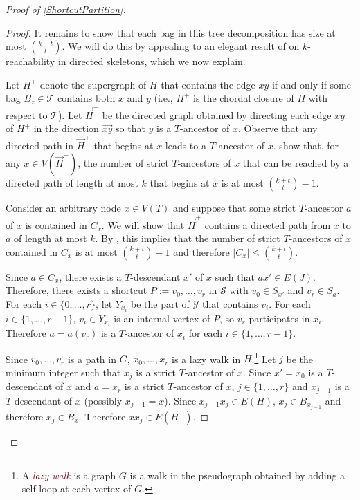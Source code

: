 \documentclass{patmorin}
\theoremstyle{plain}
\theoremstyle{definition}
\newcommand{\defin}[1]{\textcolor{Maroon}{\emph{#1}}}
\renewcommand{\SS}{\mathcal{S}}
\renewcommand{\le}{\leqslant}
\begin{document}
\begin{proof}[Proof of \cref{ShortcutPartition}]
\begin{proof}
  It remains to show that each bag in this tree decomposition has size at most $\binom{k+t}{t}$.  We will do this by appealing to an elegant result of \citet{PS21} on $k$-reachability in directed skeletons, which we now explain.

  Let $H^+$ denote the supergraph of $H$ that contains the edge $xy$ if and only if some bag $B_z\in\mathcal{T}$ contains both $x$ and $y$ (i.e., $H^+$ is the chordal closure of $H$ with respect to $\mathcal{T}$).  Let $\overrightarrow{H}^+$ be the directed graph obtained by directing each edge $xy$ of $H^+$ in the direction $\overrightarrow{xy}$ so that $y$ is a $T$-ancestor of $x$. Observe that any directed path in $\overrightarrow{H}^+$ that begins at $x$ leads to a $T$-ancestor of $x$.  \citet[Lemma~13]{PS21} show that, for any $x\in V(\overrightarrow{H}^+)$, the number of strict $T$-ancestors of $x$ that can be reached by a directed path of length at most $k$ that begins at $x$ is at most $\binom{k+t}{t}-1$.

  Consider an arbitrary node $x\in V(T)$ and suppose that some strict $T$-ancestor $a$ of $x$ is contained in $C_x$.  We will show that $\overrightarrow{H}^+$ contains a directed path from $x$ to $a$ of length at most $k$.  By \cite[Lemma~13]{PS21}, this implies that the number of strict $T$-ancestors of $x$ contained in $C_x$ is at most $\binom{k+t}{t}-1$ and therefore $|C_x|\le\binom{k+t}{t}$.

  Since $a\in C_x$, there exists a $T$-descendant $x'$ of $x$ such that $ax'\in E(J)$.  Therefore, there exists a shortcut $P:=v_0,\ldots,v_r$ in $\SS$ with $v_0\in S_{x'}$ and $v_r\in S_a$.  For each $i\in\{0,\ldots,r\}$, let $Y_{x_i}$ be the part of $\mathcal{Y}$ that contains $v_i$.  For each $i\in\{1,\ldots,r-1\}$, $v_i\in Y_{x_i}$ is an internal vertex of $P$, so $v_r$ participates in $x_i$.  Therefore $a=a(v_r)$ is a $T$-ancestor of $x_i$ for each $i\in\{1,\ldots,r-1\}$.

  Since $v_0,\ldots,v_r$ is a path in $G$, $x_0,\ldots,x_r$ is a lazy walk in $H$.\footnote{A \defin{lazy walk} is a graph $G$ is a walk in the pseudograph obtained by adding a self-loop at each vertex of $G$.}  Let $j$ be the minimum integer such that $x_j$ is a strict $T$-ancestor of $x$.  Since $x'=x_0$ is a $T$-descendant of $x$ and $a=x_r$ is a strict $T$-ancestor of $x$, $j\in\{1,\ldots,r\}$ and $x_{j-1}$ is a $T$-descendant of $x$ (possibly $x_{j-1}=x$).  Since $x_{j-1}x_j\in E(H)$, $x_j \in B_{x_{j-1}}$ and therefore $x_j\in B_x$.  Therefore $xx_j\in E(H^+)$.


\end{proof}
\end{proof}
\end{document}
